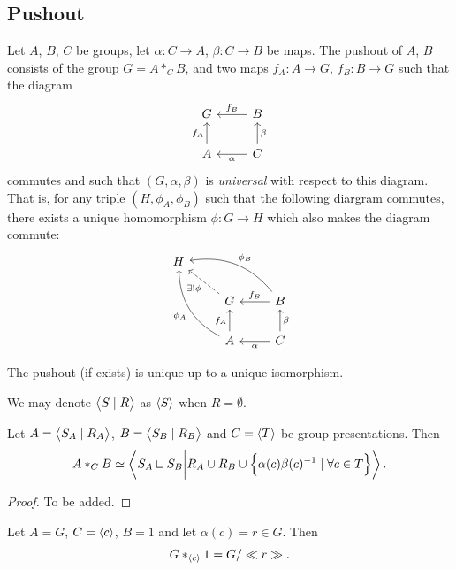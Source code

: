\documentclass[11pt,a4paper]{article}
\begin{document}
\subsection{Pushout}
\begin{definition}[Pushout]
  Let $A$, $B$, $C$ be groups,
  let $\alpha \colon C \to A$, $\beta \colon C \to B$ be maps.
  The pushout of $A$, $B$ consists of the group $G = A *_C B$,
  and two maps $f_A \colon A \to G$, $f_B \colon B \to G$ such that
  the diagram
  \[
    \begin{tikzcd}
    G                  & B \arrow[l, "f_B"']                       \\
    A \arrow[u, "f_A"] & C \arrow[l, "\alpha"] \arrow[u, "\beta"']
    \end{tikzcd}
  \]
  commutes and such that $(G,\alpha,\beta)$ is \textit{universal}
  with respect to this diagram.
  That is, for any triple $(H,\phi_A,\phi_B)$ such that the following
  diargram commutes, there exists a unique homomorphism $\phi \colon G \to H$
  which also makes the diagram commute:
  \[
    \begin{tikzcd}
    H & & \\
    & G \arrow[lu, "\exists!\phi", dashed] & 
    B \arrow[l, "f_B"'] \arrow[llu, "\phi_B"', bend right] \\
    & A \arrow[u, "f_A"] \arrow[luu, "\phi_A", bend left] &
    C \arrow[l, "\alpha"] \arrow[u, "\beta"']             
  \end{tikzcd}
  \]
\end{definition}
\begin{remark}
  The pushout (if exists) is unique up to a unique isomorphism.
\end{remark}

\begin{remark}
  We may denote $\left\langle S \mid R \right\rangle$ as $\left\langle S \right\rangle$ when
  $R = \emptyset$.
\end{remark}

\begin{proposition}
  Let $A = \left\langle S_A \mid R_A \right\rangle$, $B = \left\langle S_B \mid R_B \right\rangle$
  and $C = \left\langle T \right\rangle$ be group presentations.
  Then
  \[
    A *_C B \simeq
    \left\langle S_A \sqcup S_B \middle\vert
    R_A \cup R_B \cup \left\{\alpha(c) \beta(c)^{-1} \mid \forall c \in T\right\} \right\rangle.
  \]
\end{proposition}
\begin{proof}
  To be added.
\end{proof}

\begin{example}
  Let $A = G$, $C = \left\langle c \right\rangle$, $B = 1$ and let $\alpha(c) = r \in G$.
  Then
  \[
    G *_{\left\langle c \right\rangle} 1 = G / \ll r \gg.
  \]
\end{example}
\end{document}
